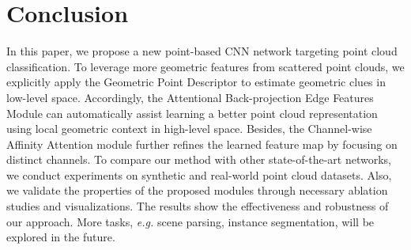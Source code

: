 \documentclass[journal,twoside]{IEEEtran}
\newcommand{\latinphrase}[1]{\textit{#1}}
\newcommand{\eg}{\latinphrase{e.g.}\xspace}
\begin{document}
\section{Conclusion}
\label{sec:concl}
In this paper, we propose a new point-based CNN network targeting point cloud classification. To leverage more geometric features from scattered point clouds, we explicitly apply the Geometric Point Descriptor to estimate geometric clues in low-level space. Accordingly, the Attentional Back-projection Edge Features Module can automatically assist learning a better point cloud representation using local geometric context in high-level space. Besides, the Channel-wise Affinity Attention module further refines the learned feature map by focusing on distinct channels. To compare our method with other state-of-the-art networks, we conduct experiments on synthetic and real-world point cloud datasets. Also, we validate the properties of the proposed modules through necessary ablation studies and visualizations. The results show the effectiveness and robustness of our approach. More tasks, \eg scene parsing, instance segmentation, will be explored in the future.

















\ifCLASSOPTIONcaptionsoff
  \newpage
\fi









\end{document}
